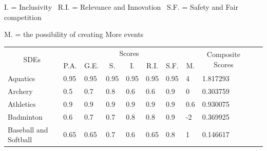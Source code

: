 \documentclass[a4paper]{article}
\begin{document}
I. = Inclusivity \ R.I. = Relevance and Innovation \ S.F. = Safety and Fair competition

M. = the possibility of creating More events
\begin{table}[h]
    \begin{tabular}{|l|lllllll|l|ll}
    \cline{1-9}
    \multicolumn{1}{|c|}{\multirow{2}{*}{SDEs}} & \multicolumn{7}{c|}{Scores}                                                                                                                                                                                 & \multicolumn{1}{c|}{\multirow{2}{*}{Composite Scores}} &  &  \\ \cline{2-8}
    \multicolumn{1}{|c|}{}                      & \multicolumn{1}{c|}{P.A.}     & \multicolumn{1}{c|}{G.E.}     & \multicolumn{1}{c|}{S.}   & \multicolumn{1}{c|}{I.}   & \multicolumn{1}{c|}{R.I.} & \multicolumn{1}{c|}{S.F.}     & \multicolumn{1}{c|}{M.} & \multicolumn{1}{c|}{}                                  &  &  \\ \cline{1-9}
    Aquatics                                    & \multicolumn{1}{l|}{0.95}     & \multicolumn{1}{l|}{0.95}     & \multicolumn{1}{l|}{0.95} & \multicolumn{1}{l|}{0.95} & \multicolumn{1}{l|}{0.95} & \multicolumn{1}{l|}{0.95}     & 4                       & 1.817293                                               &  &  \\ \cline{1-9}
    Archery                                     & \multicolumn{1}{l|}{0.5}      & \multicolumn{1}{l|}{0.7}      & \multicolumn{1}{l|}{0.8}  & \multicolumn{1}{l|}{0.6}  & \multicolumn{1}{l|}{0.6}  & \multicolumn{1}{l|}{0.9}      & 0                       & 0.303759                                               &  &  \\ \cline{1-9}
    Athletics                                   & \multicolumn{1}{l|}{0.9}      & \multicolumn{1}{l|}{0.9}      & \multicolumn{1}{l|}{0.9}  & \multicolumn{1}{l|}{0.9}  & \multicolumn{1}{l|}{0.9}  & \multicolumn{1}{l|}{0.9}      & 0.6                     & 0.930075                                               &  &  \\ \cline{1-9}
    Badminton                                   & \multicolumn{1}{l|}{0.6}      & \multicolumn{1}{l|}{0.7}      & \multicolumn{1}{l|}{0.7}  & \multicolumn{1}{l|}{0.8}  & \multicolumn{1}{l|}{0.8}  & \multicolumn{1}{l|}{0.9}      & -2                      & 0.369925                                               &  &  \\ \cline{1-9}
    Baseball and Softball                       & \multicolumn{1}{l|}{0.65}     & \multicolumn{1}{l|}{0.65}     & \multicolumn{1}{l|}{0.7}  & \multicolumn{1}{l|}{0.6}  & \multicolumn{1}{l|}{0.65} & \multicolumn{1}{l|}{0.8}      & 1                       & 0.146617                                               &  &  \\ \cline{1-9}

\end{tabular}
\end{table}
\end{document}
